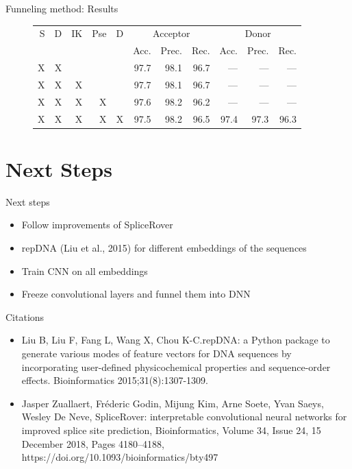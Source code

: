 \documentclass[10pt]{beamer}
\begin{document}
\begin{frame}{Funneling method: Results}
	\begin{figure}
		\footnotesize
		\centering
		\begingroup
		\def\arraystretch{1.2}
		\begin{tabular}{|r|r|r|r|r|r|r|r|r|r|r|}
			\hline
			 S&D & IK & Pse & D & \multicolumn{3}{c|}{Acceptor} & \multicolumn{3}{c|}{Donor} \\
			\cline{6-11}
			&&&&& Acc. & Prec. & Rec. & Acc. & Prec. & Rec. \\
			\hline
			X & X &&& & 97.7 & 98.1 & 96.7 & --- & --- & --- \\
			X & X & X & & & 97.7 & 98.1 & 96.7 & --- & --- & --- \\
			X & X & X & X & & 97.6 & 98.2 & 96.2 & --- & --- & --- \\
			X & X & X & X & X & 97.5 & 98.2 & 96.5 & 97.4 & 97.3 & 96.3 \\
			
			
			\hline  
		\end{tabular}
		\endgroup
	\end{figure}
\end{frame}

\section{Next Steps}
\begin{frame}{Next steps}
	\begin{itemize}
		\item Follow improvements of SpliceRover
		\item repDNA (Liu et al., 2015) for different embeddings of the sequences
		\item Train CNN on all embeddings
		\item Freeze convolutional layers and funnel them into DNN
	\end{itemize}
\end{frame}

\begin{frame}{Citations}
	\footnotesize
	\begin{itemize}
		\item Liu B, Liu F, Fang L, Wang X, Chou K-C.repDNA: a Python package to generate various modes of feature vectors for DNA sequences by incorporating user-defined physicochemical properties and sequence-order effects. Bioinformatics 2015;31(8):1307-1309.
		\item Jasper Zuallaert, Fréderic Godin, Mijung Kim, Arne Soete, Yvan Saeys, Wesley De Neve, SpliceRover: interpretable convolutional neural networks for improved splice site prediction, Bioinformatics, Volume 34, Issue 24, 15 December 2018, Pages 4180–4188, https://doi.org/10.1093/bioinformatics/bty497
	\end{itemize}
\end{frame}
\end{document}
